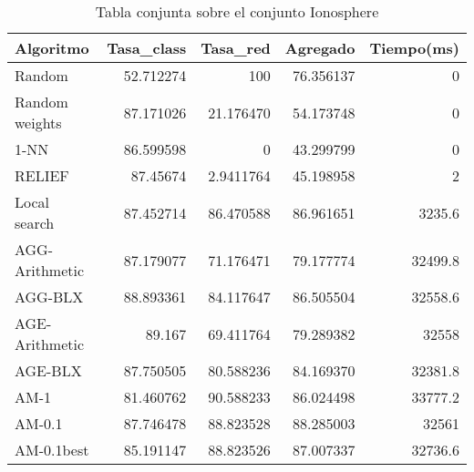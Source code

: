 \documentclass[size=a4, parskip=half, titlepage=false, toc=flat, toc=bib, 12pt]{scrartcl}
\begin{document}
 \begin{table}[ht]
  \centering
  \begin{tabular}[t]{lrrrr}
  \toprule
  Algoritmo &Tasa\_class &Tasa\_red & Agregado & Tiempo(ms)\\
  \midrule
 Random & 52.712274 & 100 & 76.356137 & 0\\
 Random weights & 87.171026 & 21.176470 & 54.173748 & 0\\
1-NN & 86.599598 & 0 & 43.299799 & 0\\
 RELIEF& 87.45674 & 2.9411764 & 45.198958 & 2\\
 Local search& 87.452714 & 86.470588 & 86.961651 & 3235.6\\
     AGG-Arithmetic& 87.179077 & 71.176471 & 79.177774 & 32499.8 \\
     AGG-BLX& 88.893361 & 84.117647 & 86.505504 & 32558.6 \\
     AGE-Arithmetic&    89.167 & 69.411764 & 79.289382 &  32558 \\
     AGE-BLX& 87.750505 & 80.588236 & 84.169370 & 32381.8 \\
     AM-1& 81.460762 & 90.588233 & 86.024498 & 33777.2 \\
     AM-0.1& 87.746478 & 88.823528 & 88.285003 &  32561 \\
     AM-0.1best& 85.191147 & 88.823526 & 87.007337 & 32736.6 \\

  \bottomrule
  \end{tabular}
  \caption{Tabla conjunta sobre el conjunto Ionosphere}
  \end{table}%

\newpage
\end{document}
